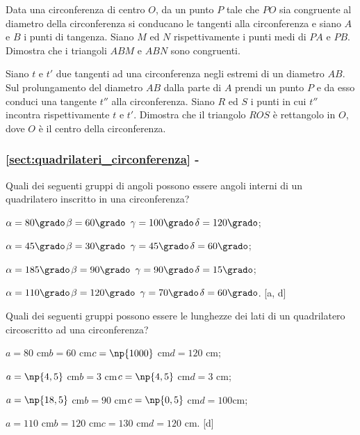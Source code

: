 \begin{multicols}{2}
\begin{esercizio}
\label{ese:5.39}
Data una circonferenza di centro $O$, da un punto $P$ tale che $PO$ 
sia congruente al diametro della circonferenza si conducano le 
tangenti alla circonferenza e siano $A$ e $B$ i punti di tangenza. 
Siano $M$ ed $N$ rispettivamente i punti medi di $PA$ e $PB$. 
Dimostra che i triangoli $ABM$ e $ABN$ sono congruenti.
\end{esercizio}

\begin{esercizio}
\label{ese:5.40}
Siano $t$ e $t'$ due tangenti ad una circonferenza negli estremi di 
un diametro $AB$. Sul prolungamento del diametro $AB$ dalla parte di 
$A$ prendi un punto $P$ e da esso conduci una tangente $t''$ alla 
circonferenza. Siano $R$ ed $S$ i punti in cui $t''$ incontra 
rispettivamente $t$ e $t'$.  Dimostra che il triangolo $ROS$ è 
rettangolo in $O$, dove $O$ è il centro della circonferenza.
\end{esercizio}

\end{multicols}

\begingroup
\hypersetup{linkcolor=black}
\subsubsection*{\ref{sect:quadrilateri_circonferenza} - 
}
\endgroup

\begin{esercizio}
\label{ese:5.41}
Quali dei seguenti gruppi di angoli possono essere angoli interni di 
un quadrilatero inscritto in una circonferenza?
\begin{enumeratea}
\item $\alpha=80\grado$\quad$\beta=60\grado$\quad 
$\gamma=100\grado$\quad $\delta=120\grado$;
\item $\alpha=45\grado$\quad $\beta=30\grado$\quad 
$\gamma=45\grado$\quad $\delta=60\grado$;
\item $\alpha=185\grado$\quad $\beta=90\grado$\quad 
$\gamma=90\grado$\quad $\delta=15\grado$;
\item $\alpha=110\grado$\quad $\beta=120\grado$\quad 
$\gamma=70\grado$\quad $\delta=60\grado$.
\hfill [a, d]
\end{enumeratea}
\end{esercizio}

\begin{esercizio}
\label{ese:5.42}
Quali dei seguenti gruppi possono essere le lunghezze dei lati di un 
quadrilatero circoscritto ad una circonferenza?
\begin{enumeratea}
\item $a=80$ cm\quad $b=60$ cm\quad $c=\np{1000}$ cm\quad $d=120$ cm;
\item $a=\np{4,5}$ cm\quad $b=3$ cm\quad $c=\np{4,5}$ cm\quad $d=3$ cm;
\item $a=\np{18,5}$ cm\quad $b=90$ cm\quad $c=\np{0,5}$ cm\quad $d=100$cm;
\item $a=110$ cm\quad $b=120$ cm\quad $c=130$ cm\quad $d=120$ cm.
\hfill [d]
\end{enumeratea}
\end{esercizio}

